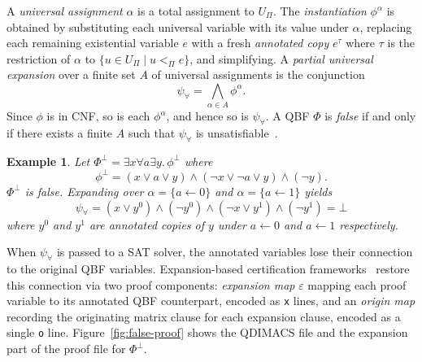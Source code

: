 \documentclass{article}
\newtheorem{example}{Example}
\begin{document}
A \emph{universal assignment} $\alpha$ is a total assignment to $U_\Pi$. The
\emph{instantiation} $\phi^\alpha$ is obtained by substituting each universal
variable with its value under $\alpha$, replacing each remaining existential
variable $e$ with a fresh \emph{annotated copy} $e^\tau$ where $\tau$ is the
restriction of $\alpha$ to $\{u \in U_\Pi \mid u <_\Pi e\}$, and simplifying. A
\emph{partial universal expansion} over a finite set $A$ of universal assignments
is the conjunction
\[
    \psi_\forall = \bigwedge_{\alpha \in A} \phi^\alpha.
\]
Since $\phi$ is in CNF, so is each $\phi^\alpha$, and hence so is $\psi_\forall$.
A QBF $\Phi$ is \emph{false} if and only if there exists a finite $A$ such that
$\psi_\forall$ is unsatisfiable~\cite{itjihad}.

\begin{example}
    \label{ex:running-false}
    Let $\Phi^\bot = \exists x \forall a \exists y.\, \phi^\bot$ where
    \[
        \phi^\bot = (x \vee a \vee y) \wedge (\neg x \vee \neg a \vee y) \wedge
        (\neg y).
    \]
    $\Phi^\bot$ is false. Expanding over $\alpha = \{a \leftarrow 0\}$ and $\alpha
        = \{a \leftarrow 1\}$ yields
    \[
        \psi_\forall = (x \vee y^0) \wedge (\neg y^0) \wedge (\neg x \vee y^1)
        \wedge (\neg y^1) = \bot
    \]
    where $y^0$ and $y^1$ are annotated copies of $y$ under $a \leftarrow 0$ and
    $a \leftarrow 1$ respectively.
\end{example}

When $\psi_\forall$ is passed to a SAT solver, the annotated variables lose their
connection to the original QBF variables. Expansion-based certification
frameworks~\cite{ferpmodels,ferat} restore this connection via two proof components:
\emph{expansion map} $\varepsilon$ mapping each proof variable to its annotated
QBF counterpart, encoded as \texttt{x} lines, and an \emph{origin map} recording
the originating matrix clause for each expansion clause, encoded as a single
\texttt{o} line. Figure~\ref{fig:false-proof} shows the QDIMACS file and the
expansion part of the proof file for $\Phi^\bot$.
\end{document}
